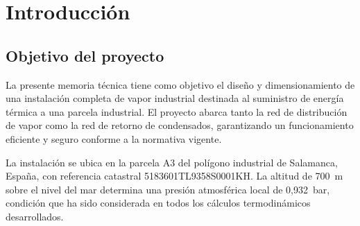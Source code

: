 \documentclass[12pt]{article}
\begin{document}

\hypersetup{linkcolor=black}
\tableofcontents\thispagestyle{empty}

{
	\let\oldnumberline\numberline	%
	\renewcommand{\numberline}{\figurename~\oldnumberline}
	\cleardoublepage						%
	\listoffigures\thispagestyle{empty}	%

}

{
	\let\oldnumberline\numberline	%
	\renewcommand{\numberline}{\tablename~\oldnumberline}
	\cleardoublepage		%
	\listoftables\thispagestyle{empty}	%
}


\hypersetup{
	linkcolor=blue,
	citecolor=blue,
	urlcolor=blue
}



\section{Introducción}
\label{Introducción}

\subsection{Objetivo del proyecto}
\label{subsec:objetivo-proyecto}

La presente memoria técnica tiene como objetivo el diseño y dimensionamiento de una instalación completa de vapor industrial destinada al suministro de energía térmica a una parcela industrial. El proyecto abarca tanto la red de distribución de vapor como la red de retorno de condensados, garantizando un funcionamiento eficiente y seguro conforme a la normativa vigente.

La instalación se ubica en la parcela A3 del polígono industrial de Salamanca, España, con referencia catastral 5183601TL9358S0001KH. La altitud de 700~m sobre el nivel del mar determina una presión atmosférica local de 0,932~bar, condición que ha sido considerada en todos los cálculos termodinámicos desarrollados.
\end{document}
